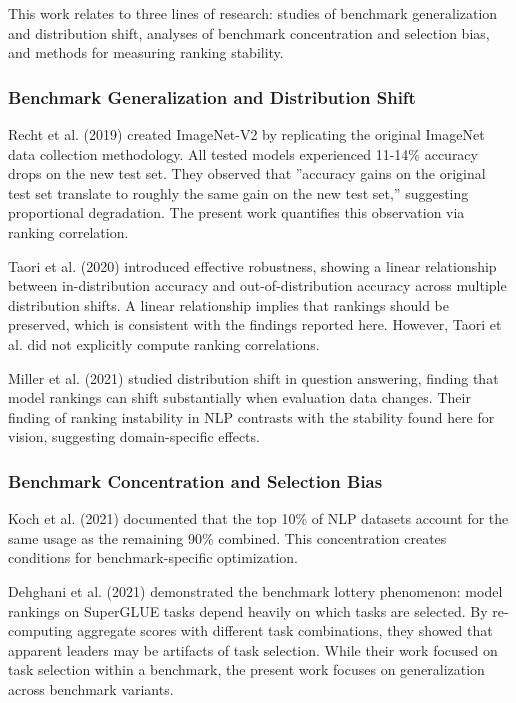 
This work relates to three lines of research: studies of benchmark generalization and distribution shift, analyses of benchmark concentration and selection bias, and methods for measuring ranking stability.

\subsubsection{Benchmark Generalization and Distribution Shift}

Recht et al. (2019) created ImageNet-V2 by replicating the original ImageNet data collection methodology. All tested models experienced 11-14\% accuracy drops on the new test set. They observed that ''accuracy gains on the original test set translate to roughly the same gain on the new test set,'' suggesting proportional degradation. The present work quantifies this observation via ranking correlation.

Taori et al. (2020) introduced effective robustness, showing a linear relationship between in-distribution accuracy and out-of-distribution accuracy across multiple distribution shifts. A linear relationship implies that rankings should be preserved, which is consistent with the findings reported here. However, Taori et al. did not explicitly compute ranking correlations.

Miller et al. (2021) studied distribution shift in question answering, finding that model rankings can shift substantially when evaluation data changes. Their finding of ranking instability in NLP contrasts with the stability found here for vision, suggesting domain-specific effects.

\subsubsection{Benchmark Concentration and Selection Bias}

Koch et al. (2021) documented that the top 10\% of NLP datasets account for the same usage as the remaining 90\% combined. This concentration creates conditions for benchmark-specific optimization.

Dehghani et al. (2021) demonstrated the benchmark lottery phenomenon: model rankings on SuperGLUE tasks depend heavily on which tasks are selected. By re-computing aggregate scores with different task combinations, they showed that apparent leaders may be artifacts of task selection. While their work focused on task selection within a benchmark, the present work focuses on generalization across benchmark variants.

